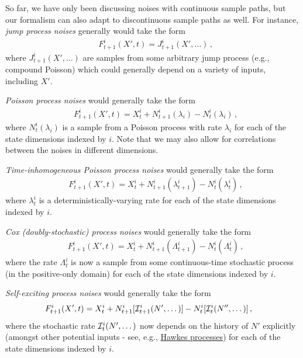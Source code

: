 \documentclass{book}
\begin{document}
So far, we have only been discussing noises with continuous sample paths, but our formalism can also adapt to discontinuous sample paths as well. For instance, \emph{jump process noises} generally would take the form
\begin{align}
& F^{i}_{t+1}(X',t)= J^i_{t+1}(X', \dots )\,,
\end{align}
where $J^i_{t+1}(X', \dots )$ are samples from some arbitrary jump process (e.g., compound Poisson) which could generally depend on a variety of inputs, including $X'$. 

\emph{Poisson process noises} would generally take the form
\begin{align}
& F^{i}_{t+1}(X',t) = X^i_{t} + N^i_{t+1}({\lambda_i})-N^i_{t}({\lambda_i})\,,
\end{align}
where $N^i_{t}({\lambda_i})$ is a sample from a Poisson process with rate $\lambda_i$ for each of the state dimensions indexed by $i$. Note that we may also allow for correlations between the noises in different dimensions.

\emph{Time-inhomogeneous Poisson process noises} would generally take the form
\begin{align}
& F^{i}_{t+1}(X',t) = X^i_{t} + N^i_{t+1}({\lambda^i_{t+1}})-N^i_{t}({\lambda^i_t}) \,,
\end{align}
where $\lambda^i_{t}$ is a deterministically-varying rate for each of the state dimensions indexed by $i$.

\emph{Cox (doubly-stochastic) process noises} would generally take the form
\begin{align}
& F^{i}_{t+1}(X',t) = X^i_{t} + N^i_{t+1}({\Lambda^i_{t+1}})-N^i_{t}({\Lambda^i_{t}}) \,,
\end{align}
where the rate $\Lambda^i_{t}$ is now a sample from some continuous-time stochastic process (in the positive-only domain) for each of the state dimensions indexed by $i$.

\emph{Self-exciting process noises} would generally take the form
\begin{align}
& F^{i}_{t+1}(X',t) = X^i_{t} + N^i_{t+1}[{\cal I}^i_{t+1}(N', \dots)]-N^i_{t}[{\cal I}^i_{t}(N'', \dots)]\,,
\end{align}
where the stochastic rate ${\cal I}^i_{t}(N', \dots)$ now depends on the history of $N'$ explicitly (amongst other potential inputs - see, e.g., \href{https://en.wikipedia.org/wiki/Hawkes_process}{Hawkes processes}) for each of the state dimensions indexed by $i$.
\end{document}
